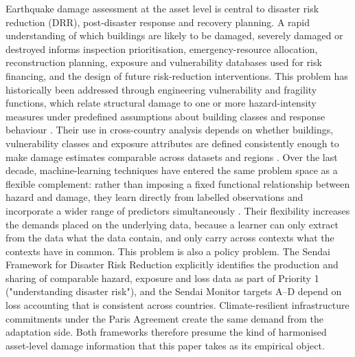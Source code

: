 \documentclass[11pt,a4paper]{article}
\begin{document}
Earthquake damage assessment at the asset level is central to disaster risk reduction (DRR), post-disaster response and recovery planning. A rapid understanding of which buildings are likely to be damaged, severely damaged or destroyed informs inspection prioritisation, emergency-resource allocation, reconstruction planning, exposure and vulnerability databases used for risk financing, and the design of future risk-reduction interventions. This problem has historically been addressed through engineering vulnerability and fragility functions, which relate structural damage to one or more hazard-intensity measures under predefined assumptions about building classes and response behaviour \citep{yepes2016vulnerability, rossetto2014empirical, erdik2017earthquake}. Their use in cross-country analysis depends on whether buildings, vulnerability classes and exposure attributes are defined consistently enough to make damage estimates comparable across datasets and regions \citep{silva2022buildingclass, yepes2023exposure}. Over the last decade, machine-learning techniques have entered the same problem space as a flexible complement: rather than imposing a fixed functional relationship between hazard and damage, they learn directly from labelled observations and incorporate a wider range of predictors simultaneously \citep{xie2020review, mangalathu2020classifying, breiman2001randomforests}. Their flexibility increases the demands placed on the underlying data, because a learner can only extract from the data what the data contain, and only carry across contexts what the contexts have in common. This problem is also a policy problem. The Sendai Framework for Disaster Risk Reduction \citep{unisdr2015sendai} explicitly identifies the production and sharing of comparable hazard, exposure and loss data as part of Priority 1 ("understanding disaster risk"), and the Sendai Monitor targets A–D depend on loss accounting that is consistent across countries. Climate-resilient infrastructure commitments under the Paris Agreement \citep{unfccc2015paris} create the same demand from the adaptation side. Both frameworks therefore presume the kind of harmonised asset-level damage information that this paper takes as its empirical object.
\end{document}
